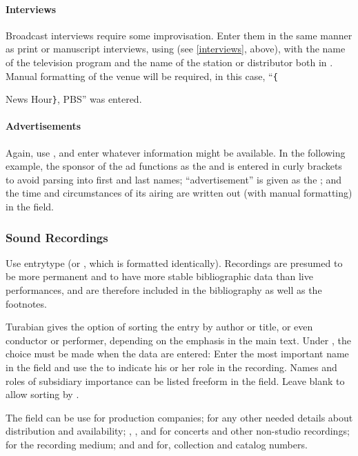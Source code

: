 \documentclass{ltxdockit}[2010/02/12]
\begin{document}
\paragraph{Interviews}
Broadcast interviews require some improvisation. Enter them in the same manner as print or manuscript interviews, using  (see \ref{interviews}, above), with  the name of the television program and the name of the station or distributor both in .\autocites[][]{rice200515} Manual formatting of the venue will be required, in this case, ``\verb|{|{News Hour\verb|}|, PBS'' was entered.

\paragraph{Advertisements}
Again, use , and enter whatever information might be available. In the following example, the sponsor of the ad functions as the  and is entered in curly brackets to avoid parsing into first and last names; ``advertisement'' is given as the ; and the time and circumstances of its airing are written out (with manual formatting) in the  field.\autocites[][]{federal-express2006caveman}

\subsubsection{Sound Recordings}\label{soundrec}
Use entrytype  (or , which is formatted identically). Recordings are presumed to be more permanent and to have more stable bibliographic data than live performances, and are therefore included in the bibliography as well as the footnotes.

Turabian gives the option of sorting the entry by author or title, or even conductor or performer, depending on the emphasis in the main text. Under , the choice must be made when the data are entered: Enter the most important name in the  field and use the  to indicate his or her role in the recording. Names and roles of subsidiary importance can be listed freeform in the  field. Leave  blank to allow sorting by .

The  field can be use for production companies;  for any other needed details about distribution and availability; , , and  for concerts and other non-studio recordings;  for the recording medium; and  and  for, \eg collection and catalog numbers.\autocites[][]{lehrer1965that-was-the-ye}

}
\end{document}
